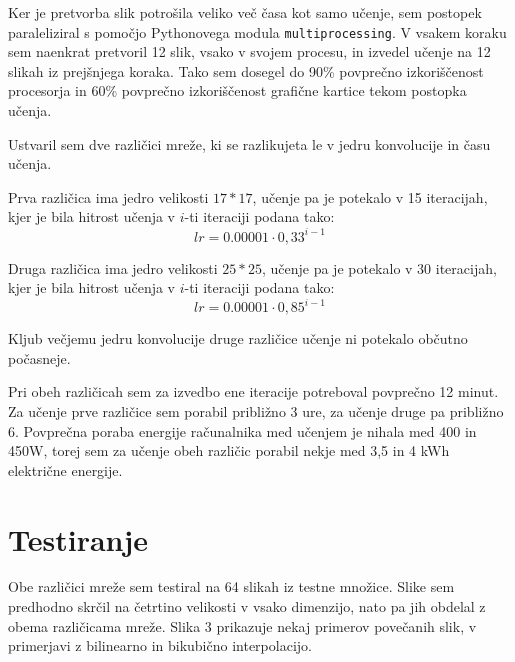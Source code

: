 \documentclass[a4paper,11pt]{article}
\begin{document}
Ker je pretvorba slik potrošila veliko več časa kot samo učenje, sem postopek paraleliziral s pomočjo Pythonovega modula \texttt{multiprocessing}.
V vsakem koraku sem naenkrat pretvoril 12 slik, vsako v svojem procesu, in izvedel učenje na 12 slikah iz prejšnjega koraka.
Tako sem dosegel do 90\% povprečno izkoriščenost procesorja in 60\% povprečno izkoriščenost grafične kartice tekom postopka učenja.

Ustvaril sem dve različici mreže, ki se razlikujeta le v jedru konvolucije in času učenja.

Prva različica ima jedro velikosti $17 * 17$, učenje pa je potekalo v 15 iteracijah, kjer je bila hitrost učenja v $i$-ti iteraciji podana tako:
\begin{equation*} 
lr = 0.00001 \cdot 0,33^{i - 1}
\end{equation*}

Druga različica ima jedro velikosti $25 * 25$, učenje pa je potekalo v 30 iteracijah, kjer je bila hitrost učenja v $i$-ti iteraciji podana tako:
\begin{equation*} 
lr = 0.00001 \cdot 0,85^{i - 1}
\end{equation*}

Kljub večjemu jedru konvolucije druge različice učenje ni potekalo občutno počasneje.

Pri obeh različicah sem za izvedbo ene iteracije potreboval povprečno 12 minut.
Za učenje prve različice sem porabil približno 3 ure, za učenje druge pa približno 6.
Povprečna poraba energije računalnika med učenjem je nihala med 400 in 450W, torej sem za učenje obeh različic porabil nekje med 3,5 in 4 kWh električne
	energije.

\section{Testiranje}

Obe različici mreže sem testiral na 64 slikah iz testne množice.
Slike sem predhodno skrčil na četrtino velikosti v vsako dimenzijo, nato pa jih obdelal z obema različicama mreže.
Slika 3 prikazuje nekaj primerov povečanih slik, v primerjavi z bilinearno in bikubično interpolacijo.
\end{document}
